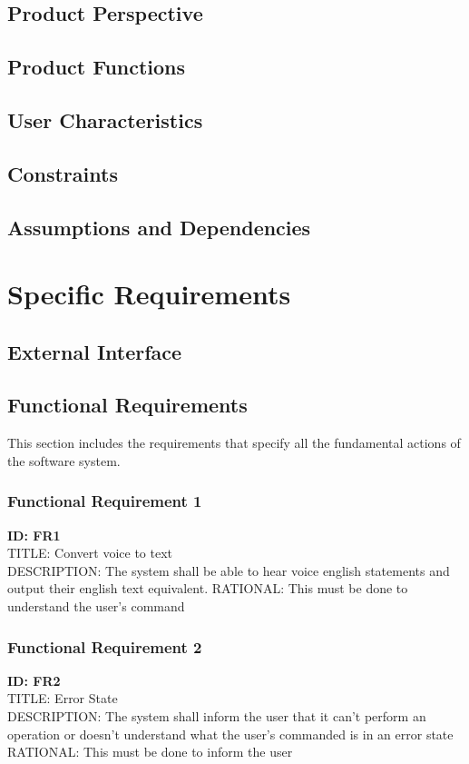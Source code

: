 \documentclass[onecolumn, draftclsnofoot,10pt, compsoc]{IEEEtran}
\begin{document}
    \subsection{Product Perspective}
        
    \subsection{Product Functions}
    \subsection{User Characteristics}
    \subsection{Constraints}
    \subsection{Assumptions and Dependencies}


\section{Specific Requirements}
    \subsection{External Interface}
    \subsection{Functional Requirements}
    This section includes the requirements that specify all the fundamental actions of the software system.
    	\subsubsection{Functional Requirement 1}
    	\textbf{ID: FR1} \\
        TITLE: Convert voice to text \\
        DESCRIPTION: The system shall be able to hear voice english statements and output their english text equivalent.
        RATIONAL: This must be done to understand the user's command \\
        
        \subsubsection{Functional Requirement 2}
    	\textbf{ID: FR2} \\
        TITLE: Error State \\
        DESCRIPTION: The system shall inform the user that it can't perform an operation or doesn't understand what the user's commanded is in an error state \\
        RATIONAL: This must be done to inform the user \\
        
\end{document}
